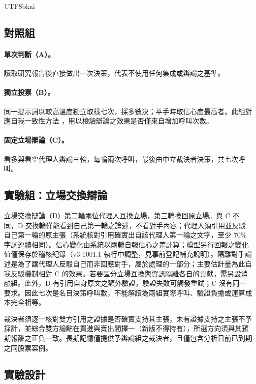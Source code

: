 \documentclass[12pt,a4paper]{article}
\newcommand{\grp}[1]{\textsf{#1}}
\begin{document}
\begin{CJK}{UTF8}{bkai}
\subsection{對照組}

\paragraph{單次判斷（\grp{A}）。}
讀取研究報告後直接做出一次決策，代表不使用任何集成或辯論之基準。

\paragraph{獨立投票（\grp{B}）。}
同一提示詞以較高溫度獨立取樣七次，採多數決；平手時取信心度最高者。此組對應自我一致性方法 \citep{wang2023selfconsistency}，用以檢驗辯論之效果是否僅來自增加呼叫次數。

\paragraph{固定立場辯論（\grp{C}）。}
看多與看空代理人辯論三輪，每輪兩次呼叫，最後由中立裁決者決策，共七次呼叫。

\subsection{實驗組：立場交換辯論}

立場交換辯論（\grp{D}）第二輪兩位代理人互換立場，第三輪換回原立場。與 \grp{C} 不同，\grp{D} 交換輪僅能看到自己第一輪之論述，不看對手內容；代理人須引用並反駁自己第一輪的原主張（系統核對引用確實出自該代理人第一輪之文字，至少 70\% 字詞連續相同）。信心變化由系統以兩輪自報信心之差計算；模型另行回報之變化值僅保存於稽核紀錄（v3-1001.1 執行中調整，見事前登記補充說明）。隔離對手論述是為了讓代理人反駁自己而非回應對手，屬於處理的一部分；主要估計量為此自我反駁機制相對 \grp{C} 的效果。若要區分立場互換與資訊隔離各自的貢獻，需另設消融組。此外，\grp{D} 有引用自身原文之額外驗證，驗證失敗可觸發重試；\grp{C} 沒有同一要求。因此七次是名目決策呼叫數，不能解讀為兩組實際呼叫、驗證負擔或運算成本完全相等。

裁決者須逐一核對雙方引用之證據是否確實支持其主張，未有證據支持之主張不予採計，並綜合雙方論點在買進與賣出間擇一（新版不得持有），所選方向須與其預期報酬之正負一致。長期記憶僅提供予辯論組之裁決者，且僅包含分析日前已到期之同股票案例。

\subsection{實驗設計}


\end{CJK}
\end{document}
